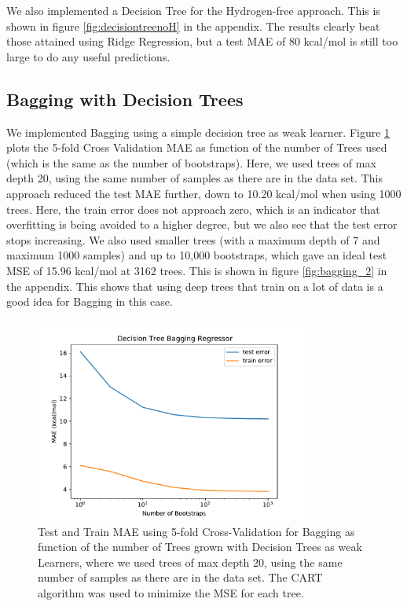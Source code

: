 \documentclass[11pt,a4paper,notitlepage]{article}
\begin{document}
We also implemented a Decision Tree for the Hydrogen-free approach. This is shown in figure \ref{fig:decisiontreenoH} in the appendix. The results clearly beat those attained using Ridge Regression, but a test MAE of 80 kcal/mol is still too large to do any useful predictions.  
\subsection{Bagging with Decision Trees}
We implemented Bagging using a simple decision tree as weak learner. Figure  \ref{fig:bagging_1}  plots the 5-fold Cross Validation MAE as function of the number of Trees used (which is the same as the number of bootstraps). Here, we used trees of max depth 20, using the same number of samples as there are in the data set. This approach reduced the test MAE further, down to 10.20 kcal/mol when using 1000 trees. Here, the train error does not approach zero, which is an indicator that overfitting is being avoided to a higher degree, but we also see that the test error stops increasing. We also used smaller trees (with a maximum depth of 7 and maximum 1000 samples) and up to 10,000 bootstraps, which gave an ideal test MSE of 15.96 kcal/mol at 3162 trees. This is shown in figure \ref{fig:bagging_2} in the appendix. This shows that using deep trees that train on a lot of data is a good idea for Bagging in this case.
\begin{figure}[H]
\centering
\includegraphics[width=0.8\textwidth]{bagging.pdf}
\caption[Bagging]{Test and Train MAE using 5-fold Cross-Validation for Bagging as function of the number of Trees grown with Decision Trees as weak Learners, where we used trees of max depth 20, using the same number of samples as there are in the data set. The CART algorithm was used to minimize the MSE for each tree.} \label{fig:bagging_1}
\end{figure}
\end{document}

